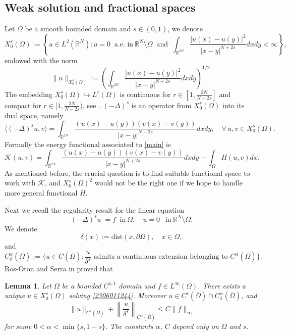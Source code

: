 \documentclass[10pt]{article}
\numberwithin{equation}{section}
\newtheorem{lemma}[theorem]{Lemma}
\numberwithin{equation}{section}
\begin{document}
\subsection{Weak solution and fractional spaces}
Let $\Omega$ be a smooth bounded domain and $s \in (0, 1)$, we denote
\[
X_0^s(\Omega):=\left\{u\in L^2(\mathbb{R}^N):u=0~ \mbox{ a.e.~in}~\mathbb{R}^N \setminus \Omega \;\;\text{and}\; \;\int_{\mathbb{R}^{2N}}{\frac{|u(x)-u(y)|^2}{|x-y|^{N+2s}}}dxdy<\infty\right\},
\]
endowed with the norm
\[
\|u\|_{X_0^s(\Omega)}:=\left( \int_{\mathbb{R}^{2N}}{\frac{|u(x)-u(y)|^2}{|x-y|^{N+2s}}}dxdy\right)^{1/2}.
\]
The embedding $X_0^s(\Omega)\hookrightarrow L^r(\Omega)$ is continuous for $r\in [1,\frac{2N}{N-2s}]$ and compact for $r\in [1,\frac{2N}{N-2s})$, see \cite[Theorems 6.5, 7.1]{Di12}.
$(-\Delta)^s$ is an operator from $X_0^s(\Omega)$ into its dual space, namely
\[
\langle (-\Delta)^s u, v \rangle=\int_{\mathbb{R}^{2N}}{\frac{(u(x)-u(y))(v(x)-v(y))}{|x-y|^{N+2s}}}dxdy,\quad \forall\, u, v\in X_0^s(\Omega).
\]
Formally the energy functional associated to \eqref{main} is
\begin{equation}\label{2401111951}
\mathcal{K}(u, v)=\int_{\mathbb{R}^{2N}}{\frac{(u(x)-u(y))(v(x)-v(y))}{|x-y|^{N+2s}}}dxdy-\int_{\Omega}H(u, v) dx.
\end{equation}
As mentioned before, the crucial question is to find suitable functional space to work with $\mathcal{K}$, and $X_0^s(\Omega)^2$ would not be the right one if we hope to handle more general functional $H$.

Next we recall the regularity result for the linear equation
\begin{equation}\label{2306011244}
(-\Delta)^{s} u\;=f \;\;\text{in}~\Omega,\quad
u =0~\;\;\text{in} ~ \mathbb{R}^N\setminus\Omega.
\end{equation}
We denote
\[
\delta(x):=\text{dist}(x, \partial\Omega),\quad x\in\Omega,
\]
and
\[
C_{\delta}^{\alpha}(\overline{\Omega}):= \Big\{u\in C(\overline\Omega): \frac{u}{\delta^s} \mbox{ admits a continuous extension belonging to } C^{\alpha}(\overline{\Omega})\Big\}.
\]
Ros-Oton and Serra in \cite[Proposition 1.1, Theorem 1.2]{RS2014} proved that
\begin{lemma}\label{2402061816}
Let $\Omega$ be a bounded $C^{1,1}$ domain and $f\in L^{\infty}(\Omega)$. There exists a unique $u\in X_0^s(\Omega)$ solving \eqref{2306011244}.  Moreover $u\in C^s(\overline{\Omega})\cap C_{\delta}^{\alpha}(\overline{\Omega})$, and
\[
\|u\|_{C^s(\overline{\Omega})}+ \left\|\frac{u}{\delta^s}\right\|_{C^\alpha(\overline{\Omega})}\le C\|f\|_{\infty}
\]
for some $0<\alpha<\min\{s, 1-s\}$. The constants $\alpha$, $C$ depend only on $\Omega$ and $s$.
\end{lemma}
\end{document}
